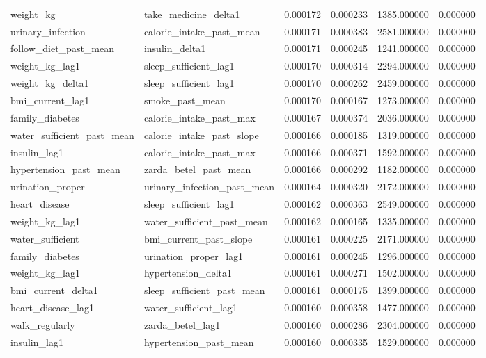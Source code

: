 \begin{longtable}{llrrrr}
weight\_kg & take\_medicine\_delta1 & 0.000172 & 0.000233 & 1385.000000 & 0.000000 \\
urinary\_infection & calorie\_intake\_past\_mean & 0.000171 & 0.000383 & 2581.000000 & 0.000000 \\
follow\_diet\_past\_mean & insulin\_delta1 & 0.000171 & 0.000245 & 1241.000000 & 0.000000 \\
weight\_kg\_lag1 & sleep\_sufficient\_lag1 & 0.000170 & 0.000314 & 2294.000000 & 0.000000 \\
weight\_kg\_delta1 & sleep\_sufficient\_lag1 & 0.000170 & 0.000262 & 2459.000000 & 0.000000 \\
bmi\_current\_lag1 & smoke\_past\_mean & 0.000170 & 0.000167 & 1273.000000 & 0.000000 \\
family\_diabetes & calorie\_intake\_past\_max & 0.000167 & 0.000374 & 2036.000000 & 0.000000 \\
water\_sufficient\_past\_mean & calorie\_intake\_past\_slope & 0.000166 & 0.000185 & 1319.000000 & 0.000000 \\
insulin\_lag1 & calorie\_intake\_past\_max & 0.000166 & 0.000371 & 1592.000000 & 0.000000 \\
hypertension\_past\_mean & zarda\_betel\_past\_mean & 0.000166 & 0.000292 & 1182.000000 & 0.000000 \\
urination\_proper & urinary\_infection\_past\_mean & 0.000164 & 0.000320 & 2172.000000 & 0.000000 \\
heart\_disease & sleep\_sufficient\_lag1 & 0.000162 & 0.000363 & 2549.000000 & 0.000000 \\
weight\_kg\_lag1 & water\_sufficient\_past\_mean & 0.000162 & 0.000165 & 1335.000000 & 0.000000 \\
water\_sufficient & bmi\_current\_past\_slope & 0.000161 & 0.000225 & 2171.000000 & 0.000000 \\
family\_diabetes & urination\_proper\_lag1 & 0.000161 & 0.000245 & 1296.000000 & 0.000000 \\
weight\_kg\_lag1 & hypertension\_delta1 & 0.000161 & 0.000271 & 1502.000000 & 0.000000 \\
bmi\_current\_delta1 & sleep\_sufficient\_past\_mean & 0.000161 & 0.000175 & 1399.000000 & 0.000000 \\
heart\_disease\_lag1 & water\_sufficient\_lag1 & 0.000160 & 0.000358 & 1477.000000 & 0.000000 \\
walk\_regularly & zarda\_betel\_lag1 & 0.000160 & 0.000286 & 2304.000000 & 0.000000 \\
insulin\_lag1 & hypertension\_past\_mean & 0.000160 & 0.000335 & 1529.000000 & 0.000000 \\

\end{longtable}
